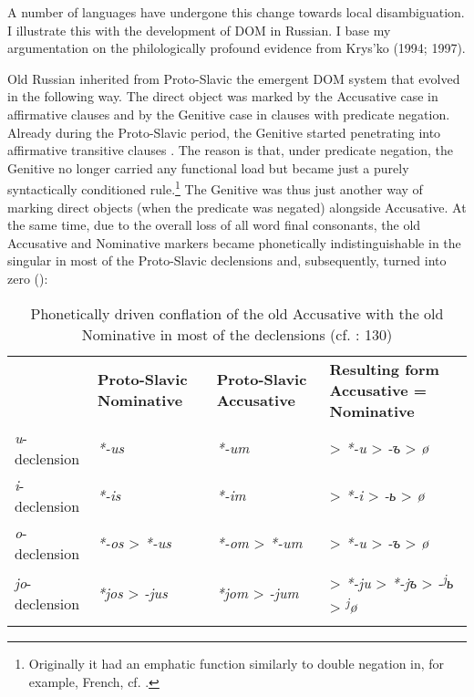 \documentclass[output=paper]{langsci/langscibook}
\begin{document}
A number of languages have undergone this change towards local disambiguation. I illustrate this with the development of DOM in Russian. I base my argumentation on the philologically profound evidence from Krys’ko (1994; 1997). 

Old Russian inherited from Proto-Slavic the emergent DOM system that evolved in the following way. The direct object was marked by the Accusative case in affirmative clauses and by the Genitive case in clauses with predicate negation. Already during the Proto-Slavic period, the Genitive started penetrating into affirmative transitive clauses \citep{Klenin1983}. The reason is that, under predicate negation, the Genitive no longer carried any functional load but became just a purely syntactically conditioned rule.\footnote{Originally it had an emphatic function similarly to double negation in, for example, French, cf. \citet{Kuryłowicz1971}.} The Genitive was thus just another way of marking direct objects (when the predicate was negated) alongside Accusative. At the same time, due to the overall loss of all word final consonants, the old Accusative and Nominative markers became phonetically indistinguishable in the singular in most of the Proto-Slavic declensions and, subsequently, turned into zero ():

\begin{table}
\begin{tabularx}{\textwidth}{lQQQ}
\lsptoprule
\bfseries ~ & \bfseries Proto-Slavic Nominative & \bfseries Proto-Slavic Accusative & {\bfseries Resulting form}
\bfseries Accusative = Nominative\\
\textit{u}{}-declension & \textit{*-us} & \textit{*-um} & > \textit{*-u} > \textit{-{ъ}} > \textit{ø}\\
\textit{i}{}-declension & \textit{*-is} & \textit{*-im} & > \textit{*-i} > \textit{-{ь}} > \textit{ø}\\
\textit{o}{}-declension & \textit{*-os} > \textit{*-us} & \textit{*-om} > \textit{*-um} & > \textit{*-u} > \textit{-{ъ}} > \textit{ø}\\
\textit{jo}{}-declension & \textit{*jos} > \textit{-jus} & \textit{*jom} > \textit{-jum} & > \textit{*-ju} > \textit{*}\textit{{}-j}\textit{{ъ} }> \textit{-\textsuperscript{j}}\textit{{ь}} > \textit{\textsuperscript{j}}\textit{ø}\\
\lspbottomrule
\end{tabularx}

\caption{Phonetically driven conflation of the old Accusative with the old Nominative in most of the declensions (cf. \citealt{Arumaa1985}: 130)}
\label{tab:serzant:1}
\end{table}
\end{document}
